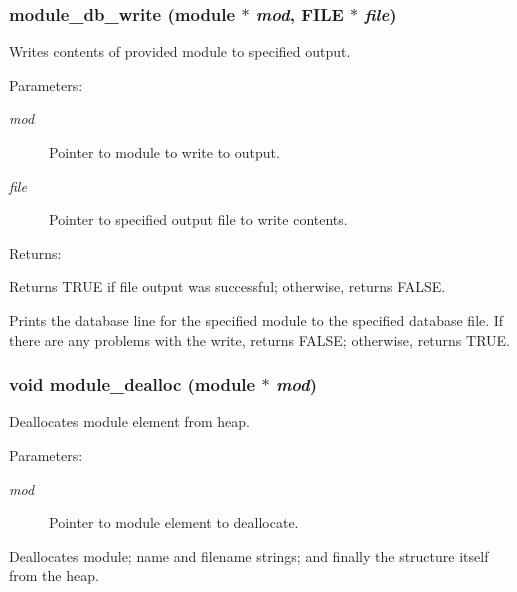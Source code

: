 \subsubsection{ module\_\-db\_\-write ({\bf module} $\ast$ {\em mod}, FILE $\ast$ {\em file})}\label{module_8c_a3}


Writes contents of provided module to specified output.

\begin{Desc}
\item[Parameters: ]\par
\begin{description}
\item[{\em 
mod}]Pointer to module to write to output. \item[{\em 
file}]Pointer to specified output file to write contents. \end{description}
\end{Desc}
\begin{Desc}
\item[Returns: ]\par
Returns TRUE if file output was successful; otherwise, returns FALSE.\end{Desc}
Prints the database line for the specified module to the specified database file. If there are any problems with the write, returns FALSE; otherwise, returns TRUE. 
\subsubsection{\setlength{\rightskip}{0pt plus 5cm}void module\_\-dealloc ({\bf module} $\ast$ {\em mod})}\label{module_8c_a8}


Deallocates module element from heap.

\begin{Desc}
\item[Parameters: ]\par
\begin{description}
\item[{\em 
mod}]Pointer to module element to deallocate.\end{description}
\end{Desc}
Deallocates module; name and filename strings; and finally the structure itself from the heap. 
